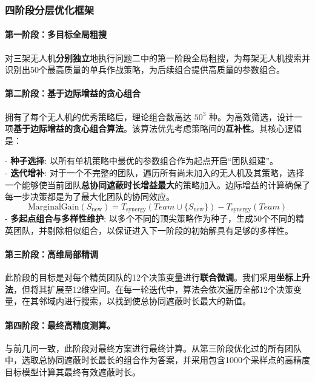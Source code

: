 \documentclass[12pt]{article}
\begin{document}
\begin{CJK}{UTF8}{gbsn}
		\subsubsection{四阶段分层优化框架}
		\paragraph{第一阶段：多目标全局粗搜}
		对三架无人机\textbf{分别独立}地执行问题二中的第一阶段全局粗搜，为每架无人机搜索并识别出50个最高质量的单兵作战策略，为后续组合提供高质量的参数组合。
		
		\paragraph{第二阶段：基于边际增益的贪心组合}
		拥有了每个无人机的优秀策略后，理论组合数高达 $50^3$ 种。为高效筛选，设计一项\textbf{基于边际增益的贪心组合算法}。该算法优先考虑策略间的\textbf{互补性}。其核心逻辑是：
		
		\indent - \textbf{种子选择}: 以所有单机策略中最优的参数组合作为起点开启“团队组建”。\\
		\indent - \textbf{迭代增补}: 对于一个不完整的团队，遍历所有尚未加入的无人机及其策略，选择一个能够使当前团队\textbf{总协同遮蔽时长增益最大}的策略加入。边际增益的计算确保了每一步决策都是为了最大化团队的协同效应。\\
		\begin{equation}
			\text{MarginalGain}(S_{\text{new}}) = T_{\text{synergy}}(Team \cup \{S_{\text{new}}\}) - T_{\text{synergy}}(Team)
		\end{equation}
		\indent - \textbf{多起点组合与多样性维护}: 以多个不同的顶尖策略作为种子，生成50个不同的精英团队，并剔除相似组合，以保证进入下一阶段的初始解具有足够的多样性。
		
		
		\paragraph{第三阶段：高维局部精调}
		此阶段的目标是对每个精英团队的12个决策变量进行\textbf{联合微调}。我们采用\textbf{坐标上升法}，但将其扩展至12维空间。在每一轮迭代中，算法会依次遍历全部12个决策变量，在其邻域内进行搜索，以找到使总协同遮蔽时长最大的新值。
		
		\paragraph{第四阶段：最终高精度测算。}
		与前几问一致，此阶段对最终方案进行最终计算。从第三阶段优化过的所有团队中，选取总协同遮蔽时长最长的组合作为答案，并采用包含1000个采样点的高精度目标模型计算其最终有效遮蔽时长。
		

\end{CJK}
\end{document}

